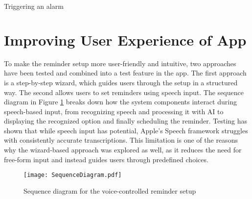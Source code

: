 \begin{program}[htbp]
\caption{Triggering an alarm}
\label{prog:alarm}
\end{program}

\section{Improving User Experience of App}
\label{sec:speech}
To make the reminder setup more user-friendly and intuitive, two approaches have been tested and combined into a test feature in the app. 
The first approach is a step-by-step wizard, which guides users through the setup in a structured way.
The second allows users to set reminders using speech input.
The sequence diagram in Figure \ref{fig:sequence} breaks down how the system components interact during speech-based input, from recognizing speech and processing it with AI to displaying the recognized option and finally scheduling the reminder.
Testing has shown that while speech input has potential, Apple's Speech framework struggles with consistently accurate transcriptions. 
This limitation is one of the reasons why the wizard-based approach was explored as well, as it reduces the need for free-form input and instead guides users through predefined choices.

\begin{figure}[htbp]
    \centering
    \texttt{[image: SequenceDiagram.pdf]}
    \caption{Sequence diagram for the voice-controlled reminder setup}
    \label{fig:sequence}
\end{figure}